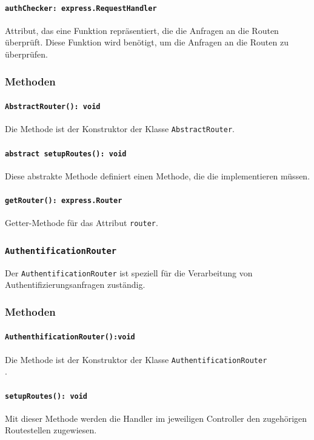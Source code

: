 \documentclass{entwurfsheft}
\begin{document}
\begin{sloppypar}
\paragraph{\texttt{authChecker: express.RequestHandler}}
Attribut, das eine Funktion repräsentiert, die die Anfragen an die Routen überprüft. Diese Funktion wird benötigt, um die Anfragen an die Routen zu überprüfen.

\subsubsection*{Methoden}
\paragraph{\texttt{AbstractRouter(): void}}
Die Methode ist der Konstruktor der Klasse \texttt{AbstractRouter}.
\paragraph{\texttt{abstract setupRoutes(): void}}
Diese abstrakte Methode definiert einen Methode, die die  implementieren müssen.
\paragraph{\texttt{getRouter(): express.Router}}
Getter-Methode für das Attribut \texttt{router}.

\subsubsection{\texttt{AuthentificationRouter}}\label{sec:AuthentificationRouter}
Der \texttt{AuthentificationRouter} ist speziell für die Verarbeitung von Authentifizierungsanfragen zuständig.
\subsubsection*{Methoden}
\paragraph{\texttt{AuthenthificationRouter():void}}
Die Methode ist der Konstruktor der Klasse \texttt{AuthentificationRouter\\}.
\paragraph{\texttt{setupRoutes(): void}}
Mit dieser Methode werden die Handler im jeweiligen Controller den zugehörigen Routestellen zugewiesen.


\end{sloppypar}
\end{document}
